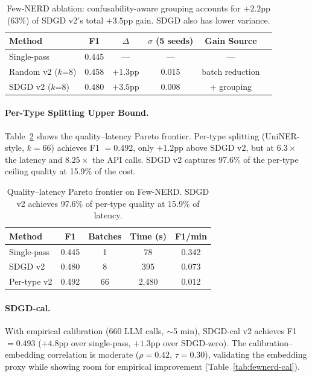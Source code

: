 \documentclass[11pt,a4paper]{article}
\begin{document}
\begin{table}[t]
\centering
\small
\begin{tabular}{lccccc}
\toprule
Method & F1 & $\Delta$ & $\sigma$ (5 seeds) & Gain Source \\
\midrule
Single-pass    & 0.445 & ---      & ---   & --- \\
Random v2 ($k$=8) & 0.458 & $+1.3$pp & 0.015 & batch reduction \\
SDGD v2 ($k$=8)   & 0.480 & $+3.5$pp & 0.008 & + grouping \\
\bottomrule
\end{tabular}
\caption{Few-NERD ablation: confusability-aware grouping accounts for $+2.2$pp (63\%) of SDGD v2's total $+3.5$pp gain. SDGD also has lower variance.}
\label{tab:fewnerd-ablation}
\end{table}

\paragraph{Per-Type Splitting Upper Bound.}
Table~\ref{tab:fewnerd-pareto} shows the quality--latency Pareto frontier. Per-type splitting (UniNER-style, $k=66$) achieves F1 $= 0.492$, only $+1.2$pp above SDGD v2, but at $6.3\times$ the latency and $8.25\times$ the API calls. SDGD v2 captures 97.6\% of the per-type ceiling quality at 15.9\% of the cost.

\begin{table}[t]
\centering
\small
\begin{tabular}{lcccc}
\toprule
Method & F1 & Batches & Time (s) & F1/min \\
\midrule
Single-pass  & 0.445 & 1  & 78   & 0.342 \\
SDGD v2      & 0.480 & 8  & 395  & 0.073 \\
Per-type v2  & 0.492 & 66 & 2,480 & 0.012 \\
\bottomrule
\end{tabular}
\caption{Quality--latency Pareto frontier on Few-NERD. SDGD v2 achieves 97.6\% of per-type quality at 15.9\% of latency.}
\label{tab:fewnerd-pareto}
\end{table}

\paragraph{SDGD-cal.}
With empirical calibration (660 LLM calls, $\sim$5 min), SDGD-cal v2 achieves F1 $= 0.493$ ($+4.8$pp over single-pass, $+1.3$pp over SDGD-zero). The calibration--embedding correlation is moderate ($\rho = 0.42$, $\tau = 0.30$), validating the embedding proxy while showing room for empirical improvement (Table~\ref{tab:fewnerd-cal}).
\end{document}
